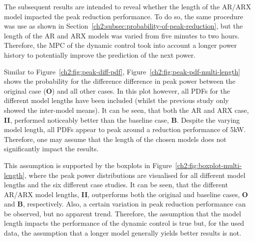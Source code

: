 The subsequent results are intended to reveal whether the length of the AR/ARX model impacted the peak reduction performance.
To do so, the same procedure was use as shown in Section~\ref{ch2:subsec:probability-of-peak-reduction}, but the length of the AR and ARX models was varied from five minutes to two hours.
Therefore, the MPC of the dynamic control took into account a longer power history to potentially improve the prediction of the next power.



Similar to Figure~\ref{ch2:fig:peak-diff-pdf}, Figure~\ref{ch2:fig:peak-pdf-multi-length} shows the probability for the difference difference in peak power between the original case (\textbf{O}) and all other cases.
In this plot however, all PDFs for the different model lengths have been included (whilst the previous study only showed the inter-model means).
It can be seen, that both the AR and ARX case, \textbf{II}, performed noticeably better than the baseline case, \textbf{B}.
Despite the varying model length, all PDFs appear to peak around a reduction performance of 5kW.
Therefore, one may assume that the length of the chosen models does not significantly impact the results.



This assumption is supported by the boxplots in Figure~\ref{ch2:fig:boxplot-multi-length}, where the peak power distributions are visualised for all different model lengths and the six different case studies.
It can be seen, that the different AR/ARX model lengths, \textbf{II}, outperforms both the original and baseline cases, \textbf{O} and \textbf{B}, respectively.
Also, a certain variation in peak reduction performance can be observed, but no apparent trend.
Therefore, the assumption that the model length impacts the performance of the dynamic control is true but, for the used data, the assumption that a longer model generally yields better results is not.



